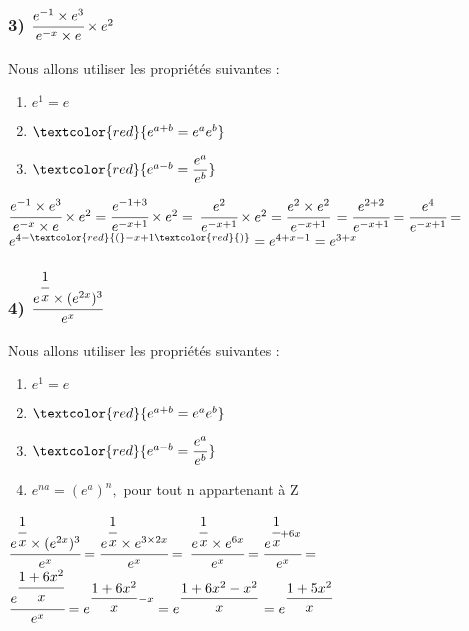 \documentclass[t]{beamer}
\begin{document}
\begin{frame}
\frametitle{3) \( \cfrac{e^{-1} \times e^3}{e^{-x} \times e} \times e^2 \) }
\pause
Nous allons utiliser les propriétés suivantes :
\pause
\begin{enumerate}
\item<+-> \( e^1 = e \)
\item<+-> \( \textcolor{red}{ e^{a+b} = e^ae^b } \)
\item<+-> \( \textcolor{red}{ e^{a-b} = \dfrac{e^a}{e^b} } \)
\end{enumerate}
\pause
\( \cfrac{e^{-1} \times e^3}{e^{-x} \times e} \times e^2 = \cfrac{e^{-1+3}}{e^{-x+1}} \times e^2 = \)
\( \cfrac{e^2}{e^{-x+1}} \times e^2 = \cfrac{e^2 \times e^2	}{e^{-x+1}} \)
\( = \cfrac{e^{2+2}}{e^{-x+1}} = \cfrac{e^4}{e^{-x+1}} = \)
\( e^{4 - \textcolor{red}{ ( }-x + 1 \textcolor{red}{ ) }} = e^{4 + x - 1} = e^{3+x} \)
\end{frame}

\begin{frame}
\frametitle{4) \( \cfrac{e^{\cfrac{1}{x}} \times (e^{2x})^3 }{e^{x}}\) }
\pause
Nous allons utiliser les propriétés suivantes :
\pause
\begin{enumerate}
\item<+-> \( e^1 = e \)
\item<+-> \( \textcolor{red}{ e^{a+b} = e^ae^b } \)
\item<+-> \( \textcolor{red}{ e^{a-b} = \dfrac{e^a}{e^b} } \)
\item<+-> \( e^{na} = (e^a)^n, \) pour tout n appartenant à Z
\end{enumerate}
\pause
\( \cfrac{e^{\cfrac{1}{x}} \times (e^{2x})^3 }{e^{x}} = \cfrac{e^{\cfrac{1}{x}} \times e^{3 \times 2x}}{e^{x}} = \)
\pause
\( \cfrac{e^{\cfrac{1}{x}} \times e^{6x}}{e^{x}} = \cfrac{e^{\cfrac{1}{x}+6x}}{e^{x}} = \)
\pause
\( \cfrac{e^{\cfrac{1+6x^2}{x}}}{e^{x}} = e^{\dfrac{1+6x^2}{x}-x} = e^{\dfrac{1+6x^2-x^2}{x}} = e^{\dfrac{1+5x^2}{x}} \)
\end{frame}
\end{document}
